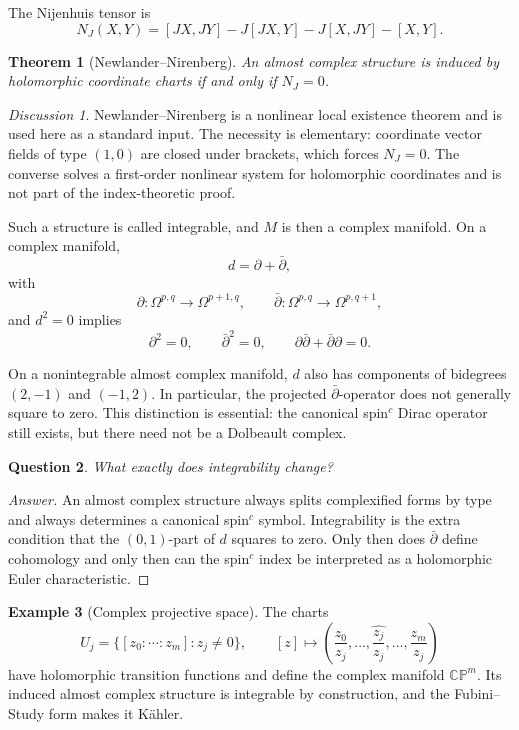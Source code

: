 \documentclass[11pt,oneside,reqno]{book}
\theoremstyle{plain}
\newtheorem{theorem}{Theorem}[chapter]
\newtheorem{question}[theorem]{Question}
\theoremstyle{definition}
\newtheorem{example}[theorem]{Example}
\theoremstyle{remark}
\newtheorem*{discussion}{Discussion}
\newenvironment{answer}{\begin{proof}[Answer]}{\end{proof}}
\begin{document}
The Nijenhuis tensor is
\[
 N_J(X,Y)
 =
 [JX,JY]-J[JX,Y]-J[X,JY]-[X,Y].
\]

\begin{theorem}[Newlander--Nirenberg]
An almost complex structure is induced by holomorphic coordinate charts if
and only if \(N_J=0\).
\end{theorem}

\begin{discussion}
Newlander--Nirenberg is a nonlinear local existence theorem and is used
here as a standard input. The necessity is elementary: coordinate vector
fields of type \((1,0)\) are closed under brackets, which forces
\(N_J=0\). The converse solves a first-order nonlinear system for
holomorphic coordinates and is not part of the index-theoretic proof.
\end{discussion}

Such a structure is called integrable, and \(M\) is then a complex
manifold. On a complex manifold,
\[
 d=\partial+\bar\partial,
\]
with
\[
 \partial:\Omega^{p,q}\to\Omega^{p+1,q},
 \qquad
 \bar\partial:\Omega^{p,q}\to\Omega^{p,q+1},
\]
and \(d^2=0\) implies
\[
 \partial^2=0,\qquad
 \bar\partial^2=0,\qquad
 \partial\bar\partial+\bar\partial\partial=0.
\]

On a nonintegrable almost complex manifold, \(d\) also has components of
bidegrees \((2,-1)\) and \((-1,2)\). In particular, the projected
\(\bar\partial\)-operator does not generally square to zero. This
distinction is essential: the canonical spin\(^{c}\) Dirac operator still
exists, but there need not be a Dolbeault complex.

\begin{question}\label{q:integrability}
What exactly does integrability change?
\end{question}

\begin{answer}
An almost complex structure always splits complexified forms by type and
always determines a canonical spin\(^{c}\) symbol. Integrability is the
extra condition that the \((0,1)\)-part of \(d\) squares to zero. Only then
does \(\bar\partial\) define cohomology and only then can the spin\(^{c}\)
index be interpreted as a holomorphic Euler characteristic.
\end{answer}

\begin{example}[Complex projective space]
The charts
\[
 U_j=\{[z_0:\cdots:z_m]:z_j\ne0\},\qquad
 [z]\longmapsto
 \left(\frac{z_0}{z_j},\ldots,
 \widehat{\frac{z_j}{z_j}},\ldots,\frac{z_m}{z_j}\right)
\]
have holomorphic transition functions and define the complex manifold
\(\mathbb{CP}^m\). Its induced almost complex structure is integrable by
construction, and the Fubini--Study form makes it Kähler.
\end{example}
\end{document}
